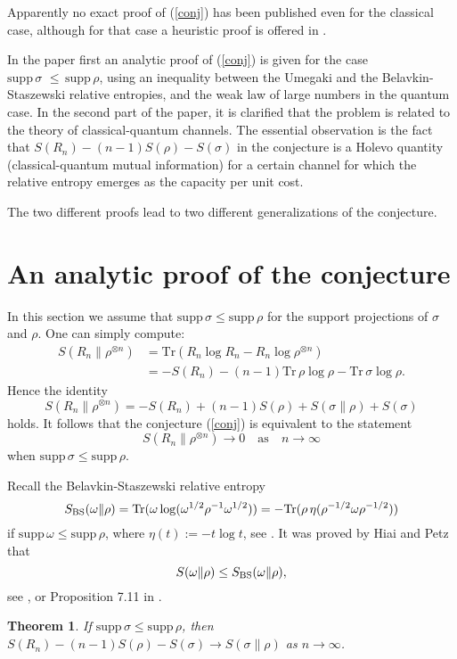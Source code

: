 \documentclass[12pt,a4paper]{article}
\newtheorem{thm}{Theorem}
\def\Tr{{\mathrm{Tr}}}
\def\supp{\mathrm{supp}\,}
\def\BS{{\rm BS}}
\begin{document}
Apparently no exact proof of (\ref{conj}) has been published even for the classical
case, although for that case a heuristic proof is offered in \cite{diosi}.

In the paper first an analytic proof of (\ref{conj}) is given for the case
$\supp \sigma\,\,\le \,\supp \rho$, using an inequality between the
Umegaki and the Belavkin-Staszewski relative entropies, and the weak law of large
numbers in the quantum case. In the second part of the paper, it is clarified that
the problem is related to the theory of classical-quantum channels. The essential
observation is the fact that $S(R_n)- (n-1)S(\rho)-S(\sigma)$ in the conjecture is
a Holevo quantity (classical-quantum mutual information) for a certain channel for
which the relative entropy emerges as the  capacity per unit cost.

The two different proofs lead to two different generalizations of the conjecture.

\section{An analytic proof of the conjecture}

In this section we assume that $\supp \sigma \le  \supp \rho$ for the support
projections of $\sigma$ and $\rho$. One can simply compute:
\begin{align*}
S(R_n\|\rho^{\otimes n})
&=\Tr (R_n\log R_n-R_n\log\rho^{\otimes n}) \\
&=-S(R_n)-(n-1)\Tr\,\rho\log\rho-\Tr\,\sigma\log\rho.
\end{align*}
Hence the identity 
$$
S(R_n\|\rho^{\otimes n}) =-S(R_n)+(n-1)S(\rho)+S(\sigma\|\rho)+S(\sigma)
$$
holds. It follows that the conjecture (\ref{conj}) is equivalent to the
statement
$$
S(R_n\|\rho^{\otimes n}) \to 0 \quad\mbox{as}\quad n\to\infty
$$
when $\supp \sigma \le \supp \rho$.

Recall the Belavkin-Staszewski relative entropy
$$
S_\BS (\omega\|\rho)= \Tr (\omega \log (\omega^{1/2} \rho^{-1} \omega^{1/2}))
= - \Tr (\rho\, \eta (\rho^{-1/2}\omega \rho^{-1/2}))
$$
if $\supp \omega \le \supp \rho$, where $\eta(t):=-t \log t$, see 
\cite{BS, OP}. It was proved by Hiai and Petz that
\begin{equation}\label{HPin}
S (\omega\|\rho) \le S_\BS (\omega\|\rho),
\end{equation}
see \cite{HP}, or Proposition 7.11 in \cite{OP}.

\begin{thm}\label{T:1}
If $\supp \sigma \le \supp \rho$, then $S(R_n) -(n-1)S(\rho)-S(\sigma)\to 
S(\sigma \| \rho)$ as $n \to \infty$.
\end{thm}
\end{document}
